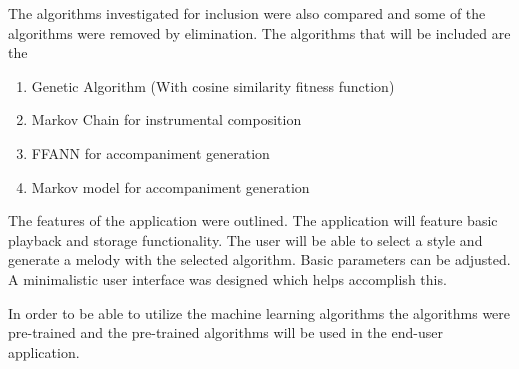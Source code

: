 The algorithms investigated for inclusion were also compared and some of the algorithms were removed by elimination. The algorithms that will be included are the
\begin{enumerate}
\item Genetic Algorithm (With cosine similarity fitness function)
\item Markov Chain for instrumental composition
\item \ac{FFANN} for accompaniment generation
\item Markov model for accompaniment generation
\end{enumerate}

The features of the application were outlined. The application will feature basic playback and storage functionality. The user will be able to select a style and generate a melody with the selected algorithm. Basic parameters can be adjusted.
A minimalistic user interface was designed which helps accomplish this.

In order to be able to utilize the machine learning algorithms the algorithms were pre-trained and the pre-trained algorithms will be used in the end-user application.

